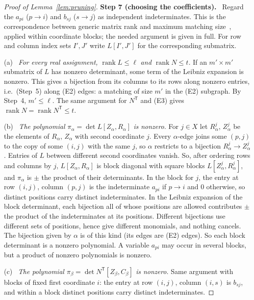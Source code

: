 \documentclass[11pt]{article}
\theoremstyle{remark}
\DeclareMathOperator{\rank}{rank}
\newcommand{\step}[1]{\par\medskip\noindent\textbf{Step #1.}\ }
\newcommand{\substep}[1]{\par\smallskip\noindent\textup{(#1)}\ }
\begin{document}
\begin{proof}[Proof of Lemma~\ref{lem:pruning}]
\step{7 (choosing the coefficients)}
Regard the $a_{pi}$ ($p\to i$) and $b_{sj}$ ($s\to j$) as independent
indeterminates. This is the correspondence between generic matrix rank and
maximum matching size~\cite[Section~5, Theorem~1]{Edmonds1967}, applied within
coordinate blocks; the needed argument is given in full. For row and column
index sets $I',J'$ write $L[I',J']$ for the corresponding submatrix.

\substep{a} \emph{For every real assignment, $\rank L\le\ell$ and
$\rank N\le t$.}
If an $m'\times m'$ submatrix of $L$ has nonzero determinant, some term of the
Leibniz expansion is nonzero. This gives a bijection from its columns to its
rows along nonzero entries, i.e.\ (Step~5) along (E2) edges: a matching of
size $m'$ in the (E2) subgraph. By Step~4, $m'\le\ell$. The same argument for
$N^{\mathsf T}$ and (E3) gives $\rank N=\rank N^{\mathsf T}\le t$.

\substep{b} \emph{The polynomial $\pi_\alpha=\det L[Z_\alpha,R_\alpha]$ is
nonzero.}
For $j\in X$ let $R_\alpha^j$, $Z_\alpha^j$ be the elements of $R_\alpha$,
$Z_\alpha$ with second coordinate $j$. Every $\alpha$-edge joins some $(p,j)$
to the copy of some $(i,j)$ with the same $j$, so $\alpha$ restricts to a
bijection $R_\alpha^j\to Z_\alpha^j$. Entries of $L$ between different second
coordinates vanish. So, after ordering rows and columns by $j$,
$L[Z_\alpha,R_\alpha]$ is block diagonal with square blocks
$L[Z_\alpha^j,R_\alpha^j]$, and $\pi_\alpha$ is $\pm$ the product of their
determinants. In the block for $j$, the entry at row $(i,j)$, column $(p,j)$
is the indeterminate $a_{pi}$ if $p\to i$ and $0$ otherwise, so distinct
positions carry distinct indeterminates. In the Leibniz expansion of the block
determinant, each bijection all of whose positions are allowed contributes
$\pm$ the product of the indeterminates at its positions. Different bijections
use different sets of positions, hence give different monomials, and nothing
cancels. The bijection given by $\alpha$ is of this kind (its edges are (E2)
edges). So each block determinant is a nonzero polynomial. A variable $a_{pi}$
may occur in several blocks, but a product of nonzero polynomials is nonzero.

\substep{c} \emph{The polynomial
$\pi_\beta=\det N^{\mathsf T}[Z_\beta,C_\beta]$ is nonzero.}
Same argument with blocks of fixed first coordinate $i$: the entry at row
$(i,j)$, column $(i,s)$ is $b_{sj}$, and within a block distinct positions
carry distinct indeterminates.


\end{proof}
\end{document}
